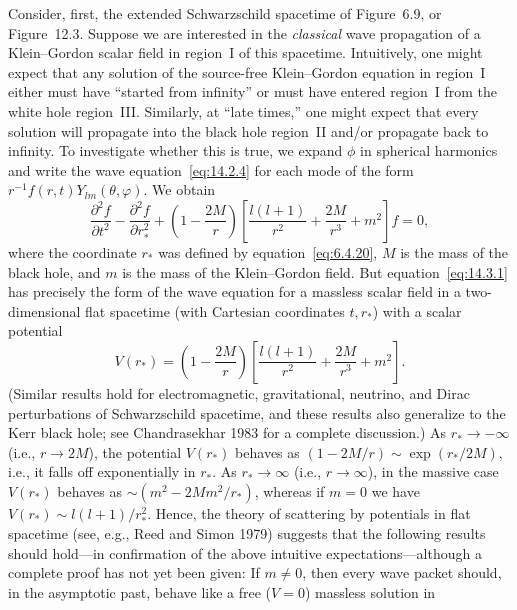 Consider, first, the extended Schwarzschild spacetime of Figure~6.9, or
Figure~12.3. Suppose we are interested in the \emph{classical} wave propagation of
a Klein--Gordon scalar field in region~I of this spacetime. Intuitively, one might
expect that any solution of the source-free Klein--Gordon equation in region~I either
must have ``started from infinity'' or must have entered region~I from the white hole
region~III. Similarly, at ``late times,'' one might expect that every solution will
propagate into the black hole region~II and/or propagate back to infinity. To
investigate whether this is true, we expand \(\phi\) in spherical harmonics and write
the wave equation~\eqref{eq:14.2.4} for each mode of the form
\(r^{-1}f(r,t)Y_{lm}(\theta,\varphi)\). We obtain
\begin{equation}
  \frac{\partial^2f}{\partial t^2}
  -\frac{\partial^2f}{\partial r_*^2}
  +\left(1-\frac{2M}{r}\right)
   \left[\frac{l(l+1)}{r^2}+\frac{2M}{r^3}+m^2\right]f=0,
  \tag{14.3.1}\label{eq:14.3.1}
\end{equation}
where the coordinate \(r_*\) was defined by equation~\eqref{eq:6.4.20}, \(M\) is
the mass of the black hole, and \(m\) is the mass of the Klein--Gordon field. But
equation~\eqref{eq:14.3.1} has precisely the form of the wave equation for a
massless scalar field in a two-dimensional flat spacetime (with Cartesian coordinates
\(t,r_*\)) with a scalar potential
\begin{equation}
  V(r_*)=\left(1-\frac{2M}{r}\right)
  \left[\frac{l(l+1)}{r^2}+\frac{2M}{r^3}+m^2\right].
  \tag{14.3.2}\label{eq:14.3.2}
\end{equation}
(Similar results hold for electromagnetic, gravitational, neutrino, and Dirac
perturbations of Schwarzschild spacetime, and these results also generalize to the
Kerr black hole; see Chandrasekhar 1983 for a complete discussion.) As
\(r_*\longrightarrow-\infty\) (i.e., \(r\longrightarrow2M\)), the potential
\(V(r_*)\) behaves as
\((1-2M/r)\sim\exp(r_*/2M)\), i.e., it falls off exponentially in \(r_*\). As
\(r_*\longrightarrow\infty\) (i.e., \(r\longrightarrow\infty\)), in the massive
case \(V(r_*)\) behaves as \(\sim(m^2-2Mm^2/r_*)\), whereas if \(m=0\) we have
\(V(r_*)\sim l(l+1)/r_*^2\). Hence, the theory of scattering by potentials in flat
spacetime (see, e.g., Reed and Simon 1979) suggests that the following results
should hold---in confirmation of the above intuitive expectations---although a
complete proof has not yet been given: If \(m\ne0\), then every wave packet should,
in the asymptotic past, behave like a free (\(V=0\)) massless solution in
